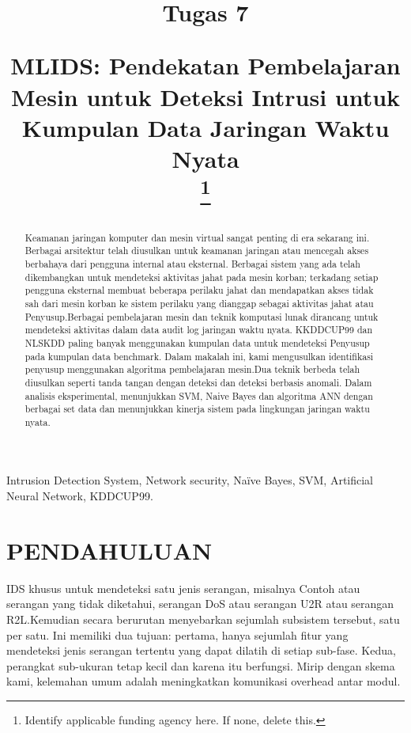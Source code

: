 \documentclass[conference]{IEEEtran}
\begin{document}
\title{Tugas 7

MLIDS: Pendekatan Pembelajaran Mesin untuk Deteksi Intrusi untuk Kumpulan Data Jaringan Waktu Nyata\\
{\footnotesize \textsuperscript{}}
\thanks{Identify applicable funding agency here. If none, delete this.}
}
\author{
\and
}

\maketitle

\begin{abstract}
Keamanan jaringan komputer dan mesin virtual sangat penting di era sekarang ini. Berbagai arsitektur telah diusulkan untuk keamanan jaringan atau mencegah akses berbahaya dari pengguna internal atau eksternal. Berbagai sistem yang ada telah dikembangkan untuk mendeteksi aktivitas jahat pada mesin korban; terkadang setiap pengguna eksternal membuat beberapa perilaku jahat dan mendapatkan akses tidak sah dari mesin korban ke sistem perilaku yang dianggap sebagai aktivitas jahat atau Penyusup.Berbagai pembelajaran mesin dan teknik komputasi lunak dirancang untuk mendeteksi aktivitas dalam data audit log jaringan waktu nyata. KKDDCUP99 dan NLSKDD paling banyak menggunakan kumpulan data untuk mendeteksi Penyusup pada kumpulan data benchmark. Dalam makalah ini, kami mengusulkan identifikasi penyusup menggunakan algoritma pembelajaran mesin.Dua teknik berbeda telah diusulkan seperti tanda tangan dengan deteksi dan deteksi berbasis anomali. Dalam analisis eksperimental, menunjukkan SVM, Naive Bayes dan algoritma ANN dengan berbagai set data dan menunjukkan kinerja sistem pada lingkungan jaringan waktu nyata.
\end{abstract}

\begin{IEEEkeywords}
Intrusion Detection System, Network security, Naïve Bayes, SVM, Artificial Neural Network, KDDCUP99.
\end{IEEEkeywords}

\section{PENDAHULUAN}
IDS khusus untuk mendeteksi satu jenis serangan,
misalnya Contoh atau serangan yang tidak diketahui, serangan DoS atau serangan U2R atau serangan R2L.Kemudian secara berurutan menyebarkan sejumlah subsistem tersebut, satu per satu. Ini memiliki dua tujuan: pertama, hanya sejumlah fitur yang mendeteksi jenis serangan tertentu yang dapat dilatih di setiap sub-fase. Kedua, perangkat sub-ukuran tetap kecil dan karena itu berfungsi. Mirip dengan skema kami, kelemahan umum adalah meningkatkan komunikasi overhead antar modul.
\end{document}
